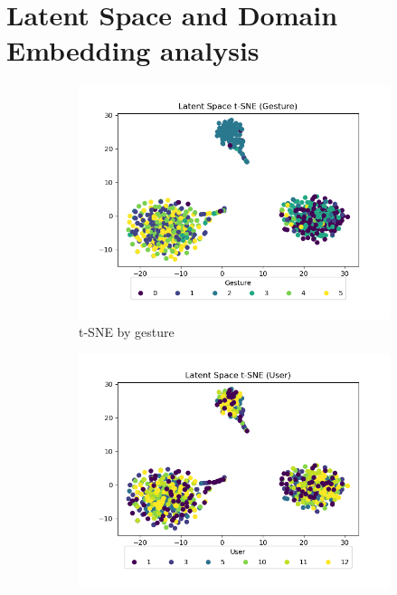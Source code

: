 \section{Latent Space and Domain Embedding analysis}

\begin{figure}
	\centering
	\begin{subfigure}{0.3\textwidth}
		\centering
		\includegraphics[width=\textwidth]{figures/mtf-ppo-one/ls-gesture}
		\caption{t-SNE by gesture}
		\label{fig:mtf-ppo-one-ls-gesture}
	\end{subfigure}
	\hfill
	\begin{subfigure}{0.3\textwidth}
		\centering
		\includegraphics[width=\textwidth]{figures/mtf-ppo-one/ls-user}

\end{subfigure}
\end{figure}
